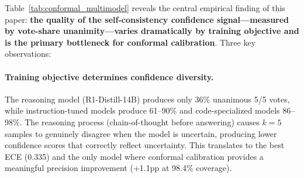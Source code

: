 \begin{table}[t]
\centering
\caption{Multi-model conformal calibration study on 247 Juliet samples (CWE-89/78/190, $k{=}5$, 5-fold CV, $\alpha{=}0.1$). ``Unanimous'' is the fraction of decisions with 5/5 vote-share agreement (confidence $= 1.0$). EVICT (No Symb.) precision and coverage shown. Models grouped by training paradigm.}
\label{tab:conformal_multimodel}
\small
\setlength{\tabcolsep}{3.5pt}
\end{table}

Table~\ref{tab:conformal_multimodel} reveals the central empirical finding of this paper: \textbf{the quality of the self-consistency confidence signal---measured by vote-share unanimity---varies dramatically by training objective and is the primary bottleneck for conformal calibration}. Three key observations:

\paragraph{Training objective determines confidence diversity.}
The reasoning model (R1-Distill-14B) produces only 36\% unanimous 5/5 votes, while instruction-tuned models produce 61--90\% and code-specialized models 86--98\%. The reasoning process (chain-of-thought before answering) causes $k=5$ samples to genuinely disagree when the model is uncertain, producing lower confidence scores that correctly reflect uncertainty. This translates to the best ECE (0.335) and the only model where conformal calibration provides a meaningful precision improvement (+1.1pp at 98.4\% coverage).

